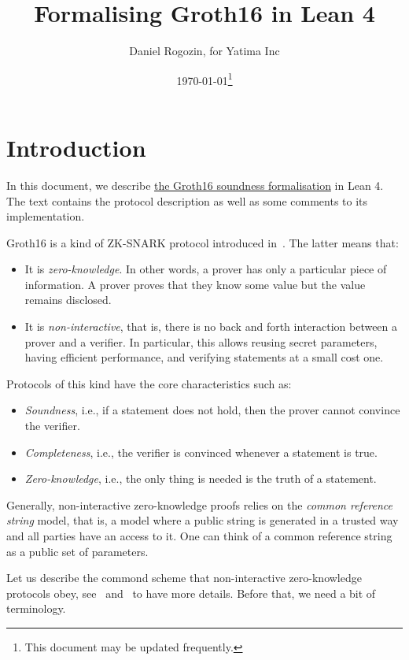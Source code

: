 \documentclass{article}
\title{Formalising Groth16 in Lean 4}
\author{Daniel Rogozin, for Yatima Inc}
\date{\today\footnote{This document may be updated frequently.}}
\theoremstyle{definition}
\theoremstyle{remark}
\begin{document}
\maketitle

\section{Introduction}

In this document, we describe \href{https://github.com/yatima-inc/ZKSnark.lean/blob/main/ZkSNARK/Groth16/KnowledgeSoundness.lean}{the Groth16 soundness formalisation} in Lean 4.
The text contains the protocol description as well as some comments to its implementation.

Groth16 is a kind of ZK-SNARK protocol introduced in~\cite{groth2016size}. The latter means that:

\begin{itemize}
\item It is \emph{zero-knowledge}. 
  In other words, a prover has only a particular piece of information. 
  A prover proves that they know some value but the value remains disclosed.
\item It is \emph{non-interactive}, that is, there is no back and forth interaction 
between a prover and a verifier. In particular, this allows reusing secret parameters, 
having efficient performance, and verifying statements at a small cost one.
\end{itemize}

Protocols of this kind have the core characteristics such as:
\begin{itemize}
\item \emph{Soundness}, i.e., if a statement does not hold, then the prover cannot convince the verifier.
\item \emph{Completeness}, i.e., the verifier is convinced whenever a statement is true.
\item \emph{Zero-knowledge}, i.e., the only thing is needed is the truth of a statement.
\end{itemize}

Generally, non-interactive zero-knowledge proofs relies on the \emph{common reference string} model, 
that is, a model where a public string is generated in a trusted way and all parties have an access to it.
One can think of a common reference string as a public set of parameters.

Let us describe the commond scheme that non-interactive zero-knowledge protocols obey, see~\cite{petkus2019and} and~\cite{bitansky2012extractable} to have more details. Before that, we need a bit of terminology.
\end{document}

